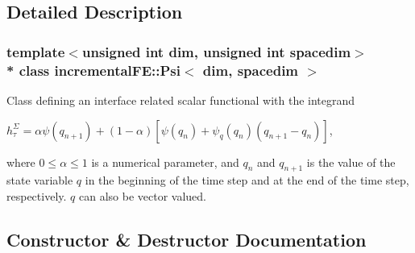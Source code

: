 \subsection{Detailed Description}
\subsubsection*{template$<$unsigned int dim, unsigned int spacedim$>$\\*
class incremental\+F\+E\+::\+Psi$<$ dim, spacedim $>$}

Class defining an interface related scalar functional with the integrand

$ h^\Sigma_\tau = \alpha \psi(q_{n+1}) + (1-\alpha) \left[ \psi(q_n) + \psi_q(q_n) (q_{n+1} - q_n)\right] $,

where $0\leq \alpha \leq 1 $ is a numerical parameter, and $q_n$ and $q_{n+1}$ is the value of the state variable $q$ in the beginning of the time step and at the end of the time step, respectively. $q$ can also be vector valued. 

\subsection{Constructor \& Destructor Documentation}
